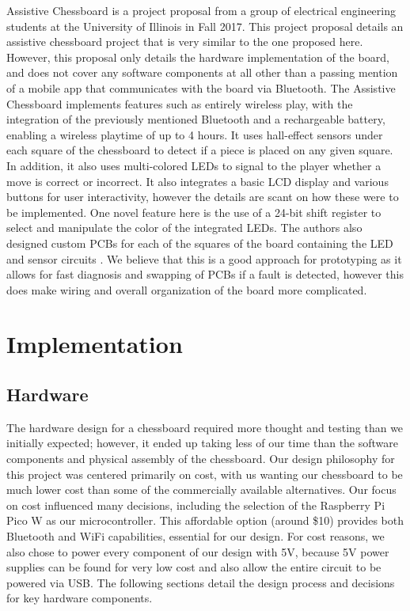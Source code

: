 \documentclass[11pt,journal]{IEEEtran}
\begin{document}
Assistive Chessboard is a project proposal from a group of electrical engineering students at the University of Illinois in Fall 2017. This project proposal details an assistive chessboard project that is very similar to the one proposed here. However, this proposal only details the hardware implementation of the board, and does not cover any software components at all other than a passing mention of a mobile app that communicates with the board via Bluetooth. The Assistive Chessboard implements features such as entirely wireless play, with the integration of the previously mentioned Bluetooth and a rechargeable battery, enabling a wireless playtime of up to 4 hours. It uses hall-effect sensors under each square of the chessboard to detect if a piece is placed on any given square. In addition, it also uses multi-colored LEDs to signal to the player whether a move is correct or incorrect. It also integrates a basic LCD display and various buttons for user interactivity, however the details are scant on how these were to be implemented. One novel feature here is the use of a 24-bit shift register to select and manipulate the color of the integrated LEDs. The authors also designed custom PCBs for each of the squares of the board containing the LED and sensor circuits \cite{assistivechess}. We believe that this is a good approach for prototyping as it allows for fast diagnosis and swapping of PCBs if a fault is detected, however this does make wiring and overall organization of the board more complicated.




\section{Implementation}
\subsection{Hardware}
The hardware design for a chessboard required more thought and testing than we initially expected; however, it ended up taking less of our time than the software components and physical assembly of the chessboard. Our design philosophy for this project was centered primarily on cost, with us wanting our chessboard to be much lower cost than some of the commercially available alternatives. Our focus on cost influenced many decisions, including the selection of the Raspberry Pi Pico W as our microcontroller. This affordable option (around \$10) provides both Bluetooth and WiFi capabilities, essential for our design. For cost reasons, we also chose to power every component of our design with 5V, because 5V power supplies can be found for very low cost and also allow the entire circuit to be powered via USB. The following sections detail the design process and decisions for key hardware components.
\end{document}
